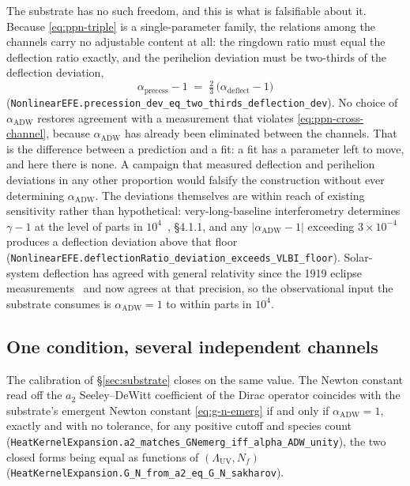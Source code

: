 \documentclass[aps,prd,nofootinbib,superscriptaddress,12pt]{revtex4-2}
\DeclareRobustCommand{\lb}{\discretionary{}{}{}}
\begin{document}
The substrate has no such freedom, and this is what is falsifiable about it.
Because \eqref{eq:ppn-triple} is a single-parameter family, the relations among
the channels carry no adjustable content at all: the ringdown ratio must equal
the deflection ratio exactly, and the perihelion deviation must be two-thirds of
the deflection deviation,
\begin{equation}
\label{eq:ppn-cross-channel}
\alpha_{\mathrm{precess}} - 1
\;=\; \tfrac{2}{3}\,\bigl(\alpha_{\mathrm{deflect}} - 1\bigr)
\end{equation}
(\texttt{Nonlinear\lb{}EFE.\lb{}precession\_\lb{}dev\_\lb{}eq\_\lb{}two\_\lb{}thirds\_\lb{}deflection\_\lb{}dev}). No
choice of $\alpha_{\mathrm{ADW}}$ restores agreement with a measurement that
violates \eqref{eq:ppn-cross-channel}, because $\alpha_{\mathrm{ADW}}$ has
already been eliminated between the channels. That is the difference between a
prediction and a fit: a fit has a parameter left to move, and here there is
none. A campaign that measured deflection and perihelion deviations in any other
proportion would falsify the construction without ever determining
$\alpha_{\mathrm{ADW}}$. The deviations themselves are within reach of existing
sensitivity rather than hypothetical: very-long-baseline interferometry
determines $\gamma - 1$ at the level of parts in $10^{4}$~\cite{Will2014},
\S4.1.1, and any $|\alpha_{\mathrm{ADW}} - 1|$ exceeding $3 \times 10^{-4}$
produces a deflection deviation above that floor
(\texttt{Nonlinear\lb{}EFE.\lb{}deflection\lb{}Ratio\_\lb{}deviation\_\lb{}exceeds\_\lb{}VLBI\_\lb{}floor}). Solar-system
deflection has agreed with general relativity since the 1919 eclipse
measurements~\cite{Eddington1919} and now agrees at that precision, so the
observational input the substrate consumes is $\alpha_{\mathrm{ADW}} = 1$ to
within parts in $10^{4}$.

\subsection{One condition, several independent channels}
\label{sec:efe-recurrence}

The calibration of \S\ref{sec:substrate} closes on the same value. The Newton
constant read off the $a_2$ Seeley--DeWitt coefficient of the Dirac operator
coincides with the substrate's emergent Newton constant \eqref{eq:g-n-emerg} if
and only if $\alpha_{\mathrm{ADW}} = 1$, exactly and with no tolerance, for any
positive cutoff and species count
(\texttt{Heat\lb{}Kernel\lb{}Expansion.\lb{}a2\_\lb{}matches\_\lb{}GNemerg\_\lb{}iff\_\lb{}alpha\_\lb{}ADW\_\lb{}unity}),
the two closed forms being equal as functions of $(\Lambda_{\mathrm{UV}}, N_f)$
(\texttt{Heat\lb{}Kernel\lb{}Expansion.\lb{}G\_\lb{}N\_\lb{}from\_\lb{}a2\_\lb{}eq\_\lb{}G\_\lb{}N\_\lb{}sakharov}).
\end{document}
